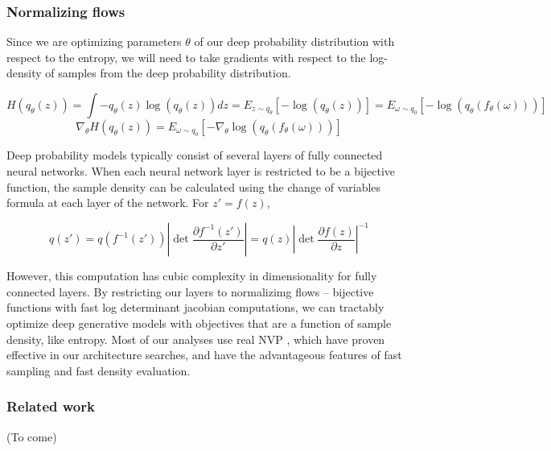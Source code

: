 \documentclass[11pt]{article}
\begin{document}
\subsubsection{Normalizing flows}\label{methods_NF}
Since we are optimizing parameters $\theta$ of our deep probability distribution with respect to the entropy, we will need to take gradients with respect to the log-density of samples from the deep probability distribution.

\begin{equation}
H(q_\theta(z)) = \int - q_\theta(z) \log(q_\theta(z)) dz = E_{z \sim q_\theta}\left[-\log(q_\theta(z)) \right] = E_{\omega \sim q_0}\left[-\log(q_\theta(f_\theta(\omega))) \right]
\end{equation}
\begin{equation}
\nabla_\theta H(q_\theta(z)) = E_{\omega \sim q_0}\left[- \nabla_\theta \log(q_\theta(f_\theta(\omega))) \right]
\end{equation}

Deep probability models typically consist of several layers of fully connected neural networks.  When each neural network layer is restricted to be a bijective function, the sample density can be calculated using the change of variables formula at each layer of the network.  For $z' = f(z)$,

\begin{equation}
q(z') = q(f^{-1}(z')) \left| \det \frac{\partial f^{-1}(z')}{\partial z'} \right| = q(z) \left| \det \frac{\partial f(z)}{\partial z} \right|^{-1}
\end{equation}

However, this computation has cubic complexity in dimensionality for fully connected layers.  By restricting our layers to normalizimg flows \cite{rezende2015variational} -- bijective functions with fast log determinant jacobian computations, we can tractably optimize deep generative models with objectives that are a function of sample density, like entropy. Most of our analyses use real NVP \cite{dinh2017density}, which have proven effective in our architecture searches, and have the advantageous features of fast sampling and fast density evaluation.

\subsubsection{Related work}\label{methods_related_work}
(To come)\\
\end{document}
